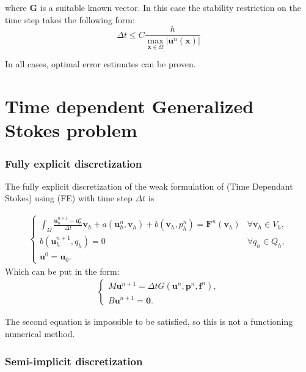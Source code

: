 \documentclass[11pt]{book}
\begin{document}
where $\mathbf{G}$ is a suitable known vector. In this case the stability restriction on the time step takes the following form:
\begin{equation}
\Delta t \leq C \frac{h}{\max _{\mathbf{x} \in \Omega}\left|\mathbf{u}^{n}(\mathbf{x})\right|}
\end{equation}

\noindent In all cases, optimal error estimates can be proven.


\section{Time dependent Generalized Stokes problem}

\subsubsection*{Fully explicit discretization}

The fully explicit discretization of the weak formulation of (Time Dependant Stokes) using (FE) with time step $\Delta t$ is

\begin{align*}
\begin{cases}
\int_{\Omega} \frac{\mathbf{u}_{h}^{n+1}-\mathbf{u}_{h}^{n}}{\Delta t} \mathbf{v}_{h}+a\left(\mathbf{u}_{h}^{n}, \mathbf{v}_{h}\right)+b\left(\mathbf{v}_{h}, p_{h}^{n}\right)=\mathbf{F}^{n}\left(\mathbf{v}_{h}\right) & \forall \mathbf{v}_{h} \in V_{h}, \\
b\left(\mathbf{u}_{h}^{n+1}, q_{h}\right)=0 & \forall q_{h} \in Q_{h}, \\
\mathbf{u}^{0}=\mathbf{u}_{0}.
\end{cases}
\end{align*}
Which can be put in the form:
\begin{align*}
\begin{cases}
M \mathbf{u}^{n+1}=\Delta t G\left(\mathbf{u}^{n}, \mathbf{p}^{n}, \mathbf{f}^{n}\right), \\
B \mathbf{u}^{n+1}=\mathbf{0}.
\end{cases}
\end{align*}

The second equation is impossible to be satisfied, so this is not a functioning numerical method.


\subsubsection*{Semi-implicit discretization}
\end{document}
